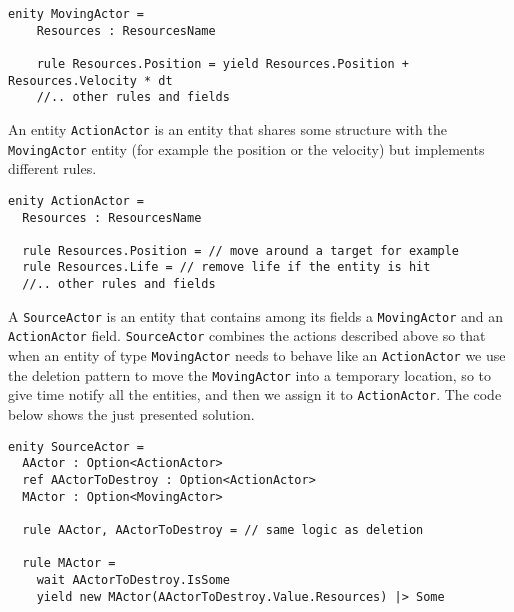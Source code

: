 \begin{lstlisting}
enity MovingActor =
	Resources : ResourcesName
	
	rule Resources.Position = yield Resources.Position + Resources.Velocity * dt
	//.. other rules and fields
\end{lstlisting}

An entity \texttt{ActionActor} is an entity that shares some structure with the \texttt{MovingActor} entity (for example the position or the velocity) but implements different rules.

\begin{lstlisting}
enity ActionActor =
  Resources : ResourcesName
  
  rule Resources.Position = // move around a target for example
  rule Resources.Life = // remove life if the entity is hit
  //.. other rules and fields
\end{lstlisting}

A \texttt{SourceActor} is an entity that contains among its fields a \texttt{MovingActor} and an \texttt{ActionActor} field. \texttt{SourceActor} combines the actions described above so that when an entity of type \texttt{MovingActor} needs to behave like an \texttt{ActionActor} we use the deletion pattern to move the \texttt{MovingActor} into a temporary location, so to give time notify all the entities, and then we assign it to \texttt{ActionActor}. The code below shows the just presented solution.

\begin{lstlisting}
enity SourceActor =
  AActor : Option<ActionActor>
  ref AActorToDestroy : Option<ActionActor>
  MActor : Option<MovingActor>
  
  rule AActor, AActorToDestroy = // same logic as deletion
  
  rule MActor = 
    wait AActorToDestroy.IsSome
    yield new MActor(AActorToDestroy.Value.Resources) |> Some
\end{lstlisting}